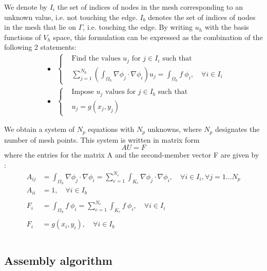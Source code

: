 \documentclass[11pt,a4paper]{article}
\begin{document}
We denote by $I_i$ the set of indices of nodes in the mesh corresponding to an unknown value, i.e. not touching the edge.
$I_b$ denotes the set of indices of nodes in the mesh that lie on $\Gamma$, i.e. touching the edge.
By writing $u_h$ with the basis functions of $V_h$ space, this formulation can be expressed as the combination of the following 2 statements:
\begin{eqnarray*}
&\bullet& \left\{
  \begin{aligned}
    &\text{Find the values $u_j$ for $j \in I_i$ such that } \\
    & \sum_{j= 1}^{N_p} \left( \int_{\Omega_h} \nabla \phi_j \cdot \nabla \phi_i \right) u_j= \int_{\Omega_h} f \ \phi_i, \quad \forall i \in I_i
  \end{aligned}
  \right. \\
&\bullet& \left\{
  \begin{aligned}
    &\text{Impose $u_j$ values for $j \in I_b$ such that } \\
    & u_j = g(x_j,y_j)
  \end{aligned}
  \right.
\end{eqnarray*}


We obtain a system of $N_p$ equations with $N_p$ unknowns, where $N_p$ designates the number of mesh points.
This system is written in matrix form
\begin{equation*}
  A U = F
\end{equation*}
where the entries for the matrix A and the second-member vector F are given by :
\begin{align*}
  A_{ij} &= \int_{\Omega_h}  \nabla \phi_j \cdot \nabla \phi_i = \sum_{e=1}^{N_e} \int_{K_e} \nabla \phi_j \cdot \nabla \phi_i ,\quad \forall i \in I_i, \forall j=1...N_p \\
  A_{ii} & = 1, \quad \forall i \in I_b \\\\
  F_i &= \int_{\Omega_h} f \ \phi_i = \sum_{e=1}^{N_e} \int_{K_e} f \ \phi_i , \quad \forall i \in I_i \\\\
  F_i &= g(x_i,y_i), \quad \forall i \in I_b \\\\
\end{align*}

\subsection{Assembly algorithm}
\end{document}
